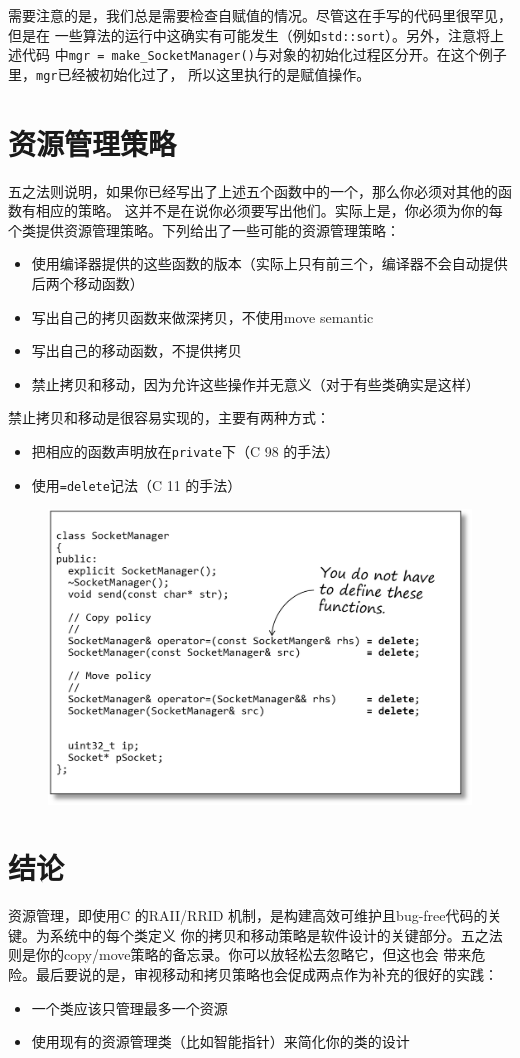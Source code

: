 \documentclass[12pt]{article}
\newcommand{\CC}{C\nolinebreak\hspace{-.05em}\raisebox{.4ex}{\tiny\bf +}%
\nolinebreak\hspace{-.10em}\raisebox{.4ex}{\tiny\bf +}}
\begin{document}
\indent{}需要注意的是，我们总是需要检查自赋值的情况。尽管这在手写的代码里很罕见，但是在
一些算法的运行中这确实有可能发生（例如\texttt{std::sort}）。另外，注意将上述代码
中\texttt{mgr = make\_SocketManager()}与对象的初始化过程区分开。在这个例子里，\texttt{mgr}已经被初始化过了，
所以这里执行的是赋值操作。

\section*{资源管理策略}
\indent{}五之法则说明，如果你已经写出了上述五个函数中的一个，那么你必须对其他的函数有相应的策略。
这并不是在说你必须要写出他们。实际上是，你必须为你的每个类提供资源管理策略。下列给出了一些可能的资源管理策略：

\begin{itemize}
    \item 使用编译器提供的这些函数的版本（实际上只有前三个，编译器不会自动提供后两个移动函数）
    \item 写出自己的拷贝函数来做深拷贝，不使用move semantic
    \item 写出自己的移动函数，不提供拷贝
    \item 禁止拷贝和移动，因为允许这些操作并无意义（对于有些类确实是这样）
\end{itemize}

\noindent{}禁止拷贝和移动是很容易实现的，主要有两种方式：
\begin{itemize}
    \item 把相应的函数声明放在\texttt{private}下（{\CC}98 的手法）
    \item 使用\texttt{=delete}记法（{\CC}11 的手法）
\end{itemize}
\begin{figure}[h]
\centering
\includegraphics[width=12cm]{./imgs/image.BBM0S0.png}
\end{figure}

\section*{结论}
\indent{}资源管理，即使用{\CC} 的RAII/RRID 机制，是构建高效可维护且bug-free代码的关键。为系统中的每个类定义
你的拷贝和移动策略是软件设计的关键部分。五之法则是你的copy/move策略的备忘录。你可以放轻松去忽略它，但这也会
带来危险。最后要说的是，审视移动和拷贝策略也会促成两点作为补充的很好的实践：
\begin{itemize}
    \item 一个类应该只管理最多一个资源
    \item 使用现有的资源管理类（比如智能指针）来简化你的类的设计
\end{itemize}
\end{document}
